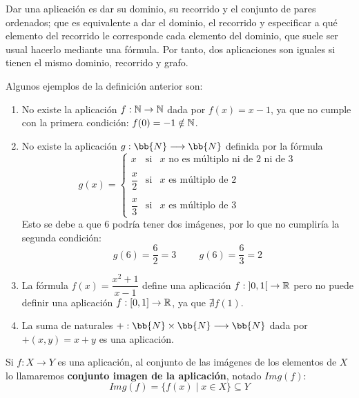 Dar una aplicación es dar su dominio, su recorrido y el conjunto de pares ordenados; que es equivalente a dar el dominio, el recorrido y especificar a qué elemento del recorrido le corresponde cada elemento del dominio, que suele ser usual hacerlo mediante una fórmula. Por tanto, dos aplicaciones son iguales si tienen el mismo dominio, recorrido y grafo.

\begin{ejemplo} Algunos ejemplos de la definición anterior son:
\begin{enumerate}
    \item No existe la aplicación $f:\mathbb N \rightarrow \mathbb N$ dada por $f(x) = x-1$, ya que no cumple con la primera condición: $f(0)=-1\notin\mathbb N$.

    \item No existe la aplicación $g:\bb{N}\longrightarrow \bb{N}$ definida por la fórmula
    \begin{equation*}
        g(x)=\left\{
        \begin{array}{ccl}
            x & \text{si} & x \text{ no es múltiplo ni de $2$ ni de $3$} \\ \\
            \dfrac{x}{2} & \text{si} & x \text{ es múltiplo de $2$} \\ \\
            \dfrac{x}{3} & \text{si} & x \text{ es múltiplo de $3$}
        \end{array}
        \right.
    \end{equation*}
    Esto se debe a que $6$ podría tener dos imágenes, por lo que no cumpliría la segunda condición:
    \begin{equation*}
        g(6)=\frac{6}{2}=3
        \hspace{1cm}
        g(6)=\frac{6}{3}=2
    \end{equation*}

    \item La fórmula $f(x) = \dfrac{x^2+1}{x-1}$ define una aplicación $f:\left]0,1\right[ \rightarrow \mathbb R$ pero no puede definir una aplicación $f:[0,1] \rightarrow \mathbb R$, ya que $\nexists f(1)$.

    \item La suma de naturales $+:\bb{N}\times \bb{N}\longrightarrow \bb{N}$ dada por $+(x,y) = x+y$ es una aplicación.
\end{enumerate}
\end{ejemplo}


\begin{definicion}
    Si $f:X \rightarrow Y$ es una aplicación, al conjunto de las imágenes de los elementos de $X$ lo
    llamaremos \textbf{conjunto imagen de la aplicación}, notado $Img(f)$:
    $$Img(f) = \{f(x) \mid x \in X\} \subseteq Y$$
\end{definicion}


